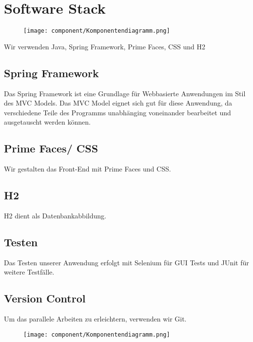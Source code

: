 \newpage
\section{Software Stack}

\begin{figure}[h]
\texttt{[image: component/Komponentendiagramm.png]}
\end{figure}
\newpage
Wir verwenden Java, Spring Framework, Prime Faces, CSS und H2

\subsection{Spring Framework}
Das Spring Framework ist eine Grundlage für Webbasierte Anwendungen im Stil des MVC Models. Das MVC Model eignet sich gut für diese Anwendung, da verschiedene Teile des Programms unabhänging voneinander bearbeitet und ausgetauscht werden können.

\subsection{Prime Faces/ CSS}
Wir gestalten das Front-End mit Prime Faces und CSS.

\subsection{H2}
H2 dient als Datenbankabbildung.

\subsection{Testen}
Das Testen unserer Anwendung erfolgt mit Selenium für GUI Tests und JUnit für weitere Testfälle.

\subsection{Version Control}
Um das parallele Arbeiten zu erleichtern, verwenden wir Git.


\newpage
\begin{figure}
\texttt{[image: component/Komponentendiagramm.png]}
\end{figure}
